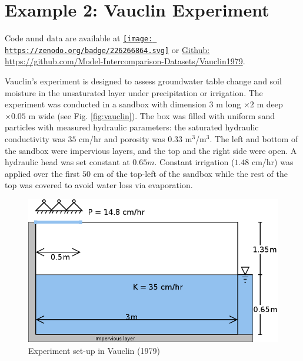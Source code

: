 \documentclass[
]{scrbook}
\begin{document}
\hypertarget{example-2-vauclin-experiment}{%
\section{Example 2: Vauclin Experiment}\label{example-2-vauclin-experiment}}

Code annd data are available at \href{https://zenodo.org/badge/latestdoi/226266864}{\texttt{[image: https://zenodo.org/badge/226266864.svg]}} or \href{https://github.com/Model-Intercomparison-Datasets/Vauclin1979}{Github: https://github.com/Model-Intercomparison-Datasets/Vauclin1979}.

Vauclin's experiment \citep{Vauclin1979} is designed to assess groundwater table change and soil moisture in the unsaturated layer under precipitation or irrigation. The experiment was conducted in a sandbox with dimension \(3\) m long \(\times 2\) m deep \(\times 0.05\) m wide (see Fig. \ref{fig:vauclin}). The box was filled with uniform sand particles with measured hydraulic parameters: the saturated hydraulic conductivity was \(35\) cm/hr and porosity was \(0.33\) m\(^3\)/m\(^3\). The left and bottom of the sandbox were impervious layers, and the top and the right side were open. A hydraulic head was set constant at \(0.65 m\). Constant irrigation (\(1.48\) cm/hr) was applied over the first \(50\) cm of the top-left of the sandbox while the rest of the top was covered to avoid water loss via evaporation.

\begin{figure}
\centering
\includegraphics{Fig/Example/Vauclin/Vauclin.png}
\caption{Experiment set-up in Vauclin (1979)}
\end{figure}
\end{document}
